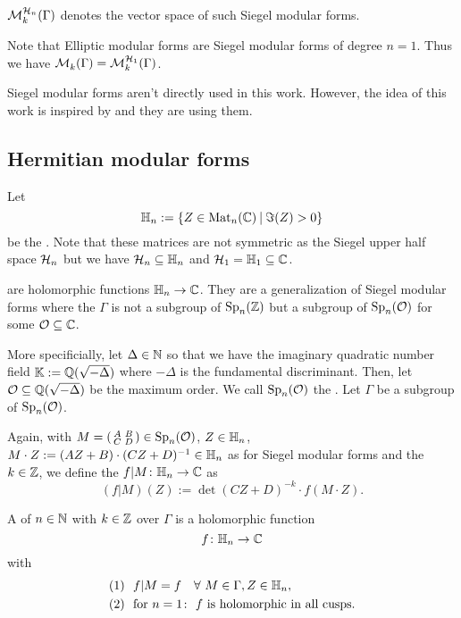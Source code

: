 $\operatorname{\mathcal{M}}^{\mathcal{H}_{n}}_{k} (\Gamma)$ denotes the vector space of such Siegel modular forms.

Note that Elliptic modular forms are Siegel modular forms of degree $n=1$. Thus we have $\operatorname{\mathcal{M}}^{}_{k} (\Gamma) = \operatorname{\mathcal{M}}^{\mathcal{H}_{1}}_{k} (\Gamma)$.

Siegel modular forms aren't directly used in this work. However, the idea of this work is inspired by \cite{PoorYuen07Comp} and they are using them.


\subsection{Hermitian modular forms}

Let
\[ \HalfPlane_n :=  \Set{ Z \in \M_n(\C) }{ \Im(Z) > 0} \]
be the . Note that these matrices are not symmetric as the Siegel upper half space $\mathcal{H}_n$ but we have $\mathcal{H}_n \subseteq \mathbb{H}_n$ and $\mathcal{H}_1 = \mathbb{H}_1 \subseteq \mathbb{C}$.

 are holomorphic functions $\mathbb{H}_n \rightarrow \mathbb{C}$. They are a generalization of Siegel modular forms where the  $\Gamma$ is not a subgroup of $\operatorname{Sp}_n(\mathbb{Z})$ but a subgroup of $\operatorname{Sp}_n(\mathcal{O})$ for some $\mathcal{O} \subseteq \mathbb{C}$.


More specificially,
let $\Delta \in \mathbb{N}$ so that we have the imaginary quadratic number field $\mathbb{K} := \mathbb{Q}(\sqrt{-\Delta})$ where $-\Delta$ is the fundamental discriminant.
Then, let $\mathcal{O} \subseteq \mathbb{Q}(\sqrt{-\Delta})$ be the maximum order.
We call $\operatorname{Sp}_n(\mathcal{O})$ the .
Let $\Gamma$ be a subgroup of $\operatorname{Sp}_n(\mathcal{O})$.

Again, with $M = \left( \begin{smallmatrix} A & B \\ C & D \end{smallmatrix} \right) \in \operatorname{Sp}_n(\mathcal{O})$, $Z \in \mathbb{H}_n$, $M \cdot Z := (A Z + B) \cdot (C Z + D)^{-1} \in \mathbb{H}_n$ as for Siegel modular forms and the  $k \in \mathbb{Z}$, we define the  $f | M \colon \mathbb{H}_n \rightarrow \mathbb{C}$ as
\[ (f|M) (Z) := \det(CZ + D)^{-k} \cdot f(M \cdot Z) .\]

A 
of  $n\in\mathbb{N}$
with  $k\in \mathbb{Z}$
over $\Gamma$
is a holomorphic function
\[ f \colon \mathbb{H}_n \rightarrow \mathbb{C} \]
with
\begin{align*}
(1) \ \ & f | M = f \quad\forall\ M \in \Gamma, Z \in \mathbb{H}_n , \\
(2) \ \ & \text{for } n = 1 \colon \ \text{$f$ is holomorphic in all cusps} .
\end{align*}

